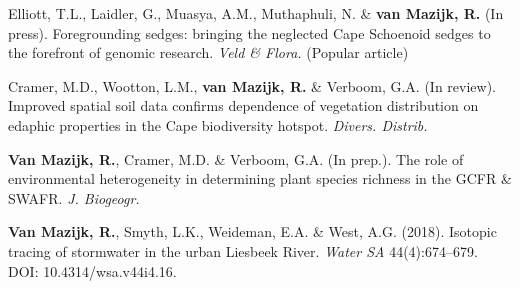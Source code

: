 \documentclass[10pt]{article}
\begin{document}
\begin{hangparas}{2em}{1}

Elliott, T.L., Laidler, G., Muasya, A.M., Muthaphuli, N. \& \textbf{van Mazijk, 
R.} (In press). Foregrounding sedges: bringing the neglected Cape Schoenoid 
sedges to the forefront of genomic research. \textit{Veld \& Flora.} (Popular 
article)

Cramer, M.D., Wootton, L.M., \textbf{van Mazijk, R.} \& Verboom, G.A. (In 
review). Improved spatial soil data confirms dependence of vegetation 
distribution on edaphic properties in the Cape biodiversity hotspot. \textit{
Divers. Distrib.}

\textbf{Van Mazijk, R.}, Cramer, M.D. \& Verboom, G.A. (In prep.). The role of
environmental heterogeneity in determining plant species richness in the GCFR \&
SWAFR. \textit{J. Biogeogr.}

\textbf{Van Mazijk, R.}, Smyth, L.K., Weideman, E.A. \& West, A.G. (2018).
Isotopic tracing of stormwater in the urban Liesbeek River. \textit{Water SA}
44(4):674--679. DOI: 10.4314/wsa.v44i4.16.


\hfill

\end{hangparas}
\end{document}
